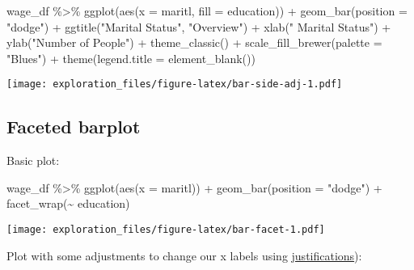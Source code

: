 \documentclass[
]{book}
\newenvironment{Shaded}{\begin{snugshade}}{\end{snugshade}}
\newcommand{\AttributeTok}[1]{\textcolor[rgb]{0.77,0.63,0.00}{#1}}
\newcommand{\FunctionTok}[1]{\textcolor[rgb]{0.00,0.00,0.00}{#1}}
\newcommand{\NormalTok}[1]{#1}
\newcommand{\SpecialCharTok}[1]{\textcolor[rgb]{0.00,0.00,0.00}{#1}}
\newcommand{\StringTok}[1]{\textcolor[rgb]{0.31,0.60,0.02}{#1}}
\begin{document}
\begin{Shaded}
\begin{Highlighting}[]
\NormalTok{wage\_df }\SpecialCharTok{\%\textgreater{}\%} 
  \FunctionTok{ggplot}\NormalTok{(}\FunctionTok{aes}\NormalTok{(}\AttributeTok{x =}\NormalTok{ maritl, }\AttributeTok{fill =}\NormalTok{ education)) }\SpecialCharTok{+}
  \FunctionTok{geom\_bar}\NormalTok{(}\AttributeTok{position =} \StringTok{"dodge"}\NormalTok{) }\SpecialCharTok{+}
  \FunctionTok{ggtitle}\NormalTok{(}\StringTok{"Marital Status"}\NormalTok{, }\StringTok{"Overview"}\NormalTok{) }\SpecialCharTok{+}
  \FunctionTok{xlab}\NormalTok{(}\StringTok{" Marital Status"}\NormalTok{) }\SpecialCharTok{+}
  \FunctionTok{ylab}\NormalTok{(}\StringTok{"Number of People"}\NormalTok{) }\SpecialCharTok{+}
  \FunctionTok{theme\_classic}\NormalTok{() }\SpecialCharTok{+}
  \FunctionTok{scale\_fill\_brewer}\NormalTok{(}\AttributeTok{palette =} \StringTok{"Blues"}\NormalTok{) }\SpecialCharTok{+}
  \FunctionTok{theme}\NormalTok{(}\AttributeTok{legend.title =} \FunctionTok{element\_blank}\NormalTok{())}
\end{Highlighting}
\end{Shaded}

\texttt{[image: exploration\_files/figure-latex/bar-side-adj-1.pdf]}

\hypertarget{faceted-barplot}{%
\subsection{Faceted barplot}\label{faceted-barplot}}

Basic plot:

\begin{Shaded}
\begin{Highlighting}[]
\NormalTok{wage\_df }\SpecialCharTok{\%\textgreater{}\%} 
  \FunctionTok{ggplot}\NormalTok{(}\FunctionTok{aes}\NormalTok{(}\AttributeTok{x =}\NormalTok{ maritl)) }\SpecialCharTok{+}
  \FunctionTok{geom\_bar}\NormalTok{(}\AttributeTok{position =} \StringTok{"dodge"}\NormalTok{) }\SpecialCharTok{+}
  \FunctionTok{facet\_wrap}\NormalTok{(}\SpecialCharTok{\textasciitilde{}}\NormalTok{ education)}
\end{Highlighting}
\end{Shaded}

\texttt{[image: exploration\_files/figure-latex/bar-facet-1.pdf]}

Plot with some adjustments to change our x labels using \href{https://ggplot2.tidyverse.org/articles/ggplot2-specs.html}{justifications}):
\end{document}
